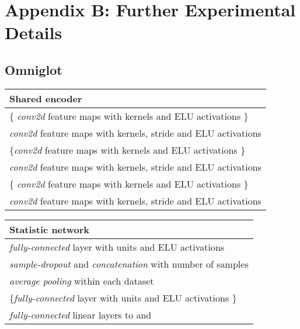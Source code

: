 \documentclass{article} \usepackage{iclr2017_conference,times}
\begin{document}
\section{Appendix B: Further Experimental Details}
\label{appendix:experimental_details}
\subsection{Omniglot}
\label{appendixb:omniglot}
\begin{table}[H]

    \begin{tabular}{  l}
    \bf{Shared encoder}  \\ \hline
     \{ \emph{conv2d}  feature maps with  kernels and ELU activations \} \\
    \emph{conv2d}  feature maps with  kernels, stride  and ELU activations \\
    
     \{\emph{conv2d}  feature maps with  kernels and ELU activations \} \\
    \emph{conv2d}  feature maps with  kernels, stride  and ELU activations  \\
    
     \{ \emph{conv2d}  feature maps with  kernels and ELU activations \} \\
    \emph{conv2d}  feature maps with  kernels, stride  and ELU activations
\label{table:omniglot_common_encoder}
    \end{tabular}
\end{table}
\begin{table}[H]

    \begin{tabular}{  l}
    \bf{Statistic network}  \\ \hline
    \emph{fully-connected} layer with  units and ELU activations \\
    \emph{sample-dropout} and \emph{concatenation} with number of samples \\
    \emph{average pooling} within each dataset\\
     \{\emph{fully-connected} layer with  units and ELU activations \} \\
    \emph{fully-connected} linear layers to  and 
\label{table:omniglot_statistic_network}
    \end{tabular}
\end{table}
\end{document}
